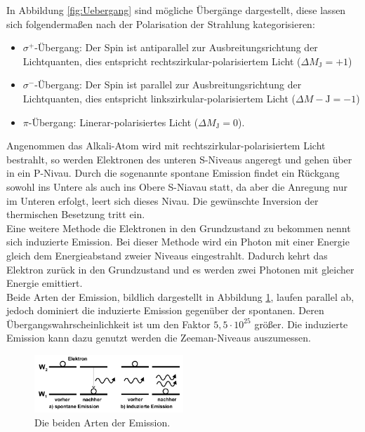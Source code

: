 In Abbildung \ref{fig:Uebergang} sind mögliche Übergänge dargestellt, diese lassen sich folgendermaßen nach der Polarisation der Strahlung kategorisieren:
\begin{itemize}
  \item{$\sigma^+$-Übergang: Der Spin ist antiparallel zur Ausbreitungsrichtung der Lichtquanten, dies entspricht rechtszirkular-polarisiertem Licht ($\Delta M_\mathrm{J}=+1$)}
  \item{$\sigma^-$-Übergang: Der Spin ist parallel zur Ausbreitungsrichtung der Lichtquanten, dies entspricht linkszirkular-polarisiertem Licht ($\Delta M-\mathrm{J}=-1$)}
  \item{$\pi$-Übergang: Linerar-polarisiertes Licht ($\Delta M_\mathrm{J}=0$)}.
\end{itemize}
Angenommen das Alkali-Atom wird mit rechtszirkular-polarisiertem Licht bestrahlt, so werden Elektronen des unteren S-Niveaus angeregt und
gehen über in ein P-Nivau. Durch die sogenannte spontane Emission findet ein Rückgang sowohl ins Untere als auch ins Obere S-Niavau statt,
da aber die Anregung nur im Unteren erfolgt, leert sich dieses Nivau.
Die gewünschte Inversion der thermischen Besetzung tritt ein.\\
Eine weitere Methode die Elektronen in den Grundzustand zu bekommen nennt sich induzierte Emission.
Bei dieser Methode wird ein Photon mit einer Energie gleich dem Energieabstand zweier Niveaus eingestrahlt. Dadurch kehrt das Elektron zurück in
den Grundzustand und es werden zwei Photonen mit gleicher Energie emittiert.\\
Beide Arten der Emission, bildlich dargestellt in Abbildung \ref{fig:emission}, laufen parallel ab, jedoch dominiert die induzierte Emission gegenüber der spontanen.
Deren Übergangswahrscheinlichkeit ist um den Faktor $5,5\cdot10^25$ größer. Die induzierte Emission kann dazu genutzt werden die Zeeman-Niveaus auszumessen.
\begin{figure}
    \centering
    \includegraphics[width=0.5\textwidth]{emission.PNG}
    \caption{Die beiden Arten der Emission.\cite{skript}}
    \label{fig:emission}
\end{figure}

